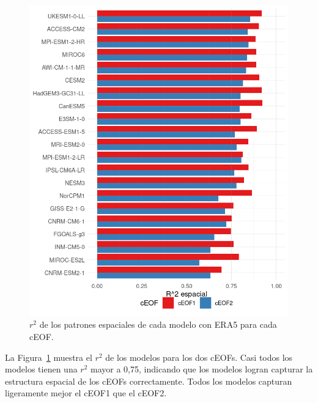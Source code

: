 \documentclass[12pt,oneside,a4paper]{reedthesis}
\begin{document}
\begin{figure}

{\centering \includegraphics{figures/50-cmip6/comparacion-r2-1} 

}

\caption{\(r^2\) de los patrones espaciales de cada modelo con ERA5 para cada cEOF.}\label{fig:comparacion-r2}
\end{figure}

La Figura~\ref{fig:comparacion-r2} muestra el \(r^2\) de los modelos para los dos cEOFs.
Casi todos los modelos tienen una \(r^2\) mayor a 0,75, indicando que los modelos logran capturar la estructura espacial de los cEOFs correctamente.
Todos los modelos capturan ligeramente mejor el cEOF1 que el cEOF2.
\end{document}
